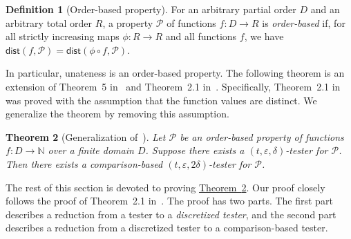 \documentclass[11pt]{article}
\numberwithin{equation}{section}
\newtheorem{theorem}{Theorem}[section]
\theoremstyle{definition}
\newtheorem{definition}[theorem]{Definition}
\theoremstyle{plain}
\newcommand{\N}{\mathbb N}
\newcommand{\expref}[2]{\hyperref[#2]{#1~\ref{#2}}}
\newcommand{\eps}{\varepsilon}
\newcommand{\cP}{\ensuremath{\mathcal{P}}}
\newcommand{\dist}{\mathsf{dist}}
\newcommand{\Thm}[1]{\expref{Theorem}{thm:#1}}
\begin{document}
\begin{definition}[Order-based property]\label{def:obp}
For an arbitrary partial order $D$ and an arbitrary total order $R$, a property $\cP$ of functions $f:D \to R$ is \emph{order-based} if,
for all strictly increasing maps $\phi: R \to R$ and all functions $f$, we have $\dist(f,\cP) = \dist(\phi\circ f, \cP)$.
\end{definition}

In particular, unateness is an order-based property.
The following theorem is an extension of Theorem~5 in~\cite{Fis04} and Theorem~2.1 in~\cite{CS14}.
Specifically, Theorem~2.1 in~\cite{CS14} was proved with the assumption that the function values are distinct. We generalize
%
the theorem
by removing this assumption.

\begin{theorem}[Generalization of~\cite{Fis04,CS14}]\label{thm:CS14}
Let $\cP$ be an order-based property of functions $f:D \to \N$ over a finite domain $D$. Suppose there exists a $(t,\eps,\delta)$-tester for $\cP$.
Then there exists a comparison-based $(t,\eps,2\delta)$-tester
for $\cP$.
\end{theorem}

The rest of this section is devoted to proving \Thm{CS14}.
Our proof closely follows the proof of Theorem~2.1 in~\cite{CS14}.
The proof has two parts. The first part describes a reduction from a tester to a \emph{discretized tester}, and the second part describes a reduction from a discretized tester to a comparison-based tester.
\end{document}
